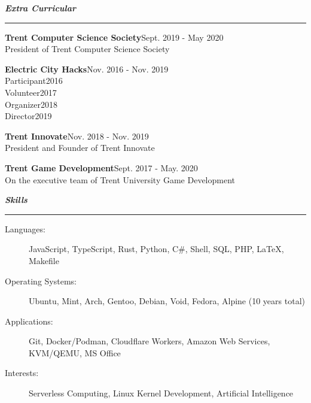 \documentclass[letterpaper,11pt]{article}
\newcommand{\mysection}[1]{\vspace{5pt} {\bfseries \textsl{#1}} \\ {\color{gray} \rule[5pt]{\textwidth}{1pt}}}
\begin{document}
\mysection{Extra Curricular}
\begin{description}
    \item \textbf{Trent Computer Science Society}\hfill Sept. 2019 - May 2020\\
        President of Trent Computer Science Society
    \item \textbf{Electric City Hacks}\hfill Nov. 2016 - Nov. 2019\\
        Participant\hfill 2016\\
        Volunteer\hfill 2017\\
        Organizer\hfill 2018\\
        Director\hfill 2019
    \item \textbf{Trent Innovate}\hfill Nov. 2018 - Nov. 2019\\
        President and Founder of Trent Innovate
    \item \textbf{Trent Game Development}\hfill Sept. 2017 - May. 2020\\
        On the executive team of Trent University Game Development
\end{description}

\mysection{Skills}
\begin{description}
    \item[Languages:]
        JavaScript, TypeScript, Rust, Python, C\#, Shell, SQL, PHP, \LaTeX{}, Makefile
    \item[Operating Systems:]
        Ubuntu, Mint, Arch, Gentoo, Debian, Void, Fedora, Alpine (10 years total)
    \item[Applications:]
        Git, Docker/Podman, Cloudflare Workers, Amazon Web Services, KVM/QEMU, MS Office
    \item[Interests:]
        Serverless Computing, Linux Kernel Development, Artificial Intelligence
\end{description}
\end{document}

